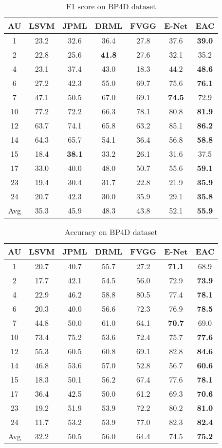 \documentclass[a4paper, 10pt, conference]{ieeeconf}      %
\begin{document}
\begin{table}
\caption{F1 score on BP4D dataset}
\label{tab3}
\begin{center}
\begin{tabular}{|c|c|c|c|c|c|c|}
\hline
AU& LSVM& JPML\cite{p13}& DRML\cite{p22}& FVGG& E-Net& EAC\\
\hline
1& 23.2& 32.6& 36.4& 27.8 &37.6& {\bf 39.0}\\
2& 22.8& 25.6& {\bf 41.8}& 27.6& 32.1& 35.2\\
4& 23.1& 37.4& 43.0& 18.3& 44.2& {\bf 48.6}\\
6& 27.2& 42.3& 55.0& 69.7& 75.6& {\bf 76.1}\\
7& 47.1& 50.5& 67.0& 69.1& {\bf 74.5}& 72.9\\
10&77.2&72.2&66.3&78.1&80.8&{\bf 81.9}\\
12&63.7&74.1&65.8&63.2&85.1&{\bf 86.2}\\
14&64.3&65.7&54.1&36.4&56.8&{\bf 58.8}\\
15&18.4&{\bf 38.1}&33.2&26.1&31.6&37.5\\
17&33.0&40.0&48.0&50.7&55.6&{\bf 59.1}\\
23&19.4&30.4&31.7&22.8&21.9&{\bf 35.9}\\
24&20.7&42.3&30.0&35.9&29.1&{\bf 35.8}\\
Avg&35.3&45.9&48.3&43.8&52.1&{\bf55.9}\\
\hline
\end{tabular}
\end{center}
\end{table}


\begin{table}
\caption{Accuracy on BP4D dataset}
\label{tab4}
\begin{center}
\begin{tabular}{|c|c|c|c|c|c|c|}
\hline
AU& LSVM& JPML\cite{p13}& DRML\cite{p22}& FVGG& E-Net& EAC\\
\hline
1&20.7&40.7&55.7&27.2&{\bf 71.1}&68.9\\
2&17.7&42.1&54.5&56.0&72.9&{\bf 73.9}\\
4&22.9&46.2&58.8&80.5&77.4&{\bf 78.1}\\
6&20.3&40.0&56.6&72.3&76.9&{\bf 78.5}\\
7&44.8&50.0&61.0&64.1&{\bf 70.7}&69.0\\
10&73.4&	75.2&53.6&72.4&75.7&{\bf 77.6}\\
12&55.3&60.5&60.8&69.1&82.8&{\bf 84.6}\\
14&46.8&53.6&57.0&52.8&56.7&{\bf 60.6}\\
15&18.3&50.1&56.2&67.4&77.6&{\bf 78.1}\\
17&36.4&42.5&50.0&61.2&69.3&{\bf 70.6}\\
23&19.2&51.9&53.9&72.2&80.2&{\bf 81.0}\\
24&11.7&53.2&53.9&77.0&82.3&{\bf 82.4}\\
Avg&32.2&50.5&56.0&64.4&74.5&{\bf 75.2}\\

\hline
\end{tabular}
\end{center}
\end{table}
\end{document}
